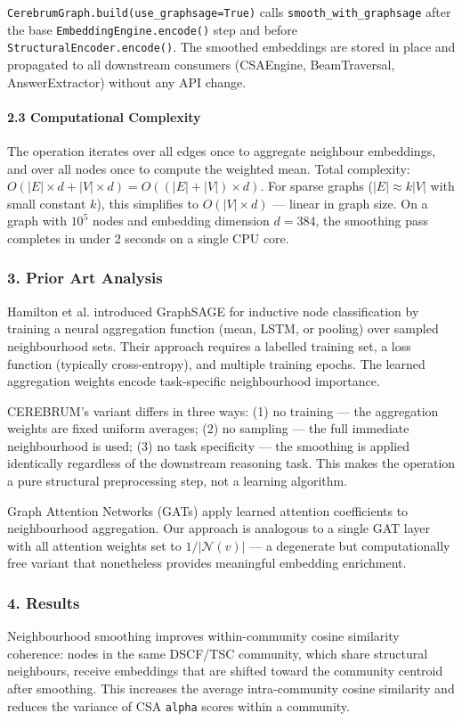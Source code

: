 \texttt{CerebrumGraph.build(use\_graphsage=True)} calls \texttt{smooth\_with\_graphsage} after the base \texttt{EmbeddingEngine.encode()} step and before \texttt{StructuralEncoder.encode()}. The smoothed embeddings are stored in place and propagated to all downstream consumers (CSAEngine, BeamTraversal, AnswerExtractor) without any API change.

\paragraph{2.3 Comput\-ational Complexity}
The operation iterates over all edges once to aggregate neighbour embeddings, and over all nodes once to compute the weighted mean. Total complexity: $O(|E| \times d + |V| \times d) = O((|E| + |V|) \times d)$. For sparse graphs ($|E| \approx k|V|$ with small constant $k$), this simplifies to $O(|V| \times d)$ — linear in graph size. On a graph with $10^5$ nodes and embedding dimension $d = 384$, the smoothing pass completes in under 2 seconds on a single CPU core.

\subsubsection{3. Prior Art Analysis}
Hamilton et al. \cite{hamilton2017graphsage} introduced GraphSAGE for inductive node class\-ification by training a neural aggregation function (mean, LSTM, or pooling) over sampled neigh\-bourhood sets. Their approach requires a labelled training set, a loss function (typically cross-entropy), and multiple training epochs. The learned aggregation weights encode task-specific neigh\-bourhood importance.

CEREBRUM's variant differs in three ways: (1) no training — the aggregation weights are fixed uniform averages; (2) no sampling — the full immediate neigh\-bourhood is used; (3) no task specificity — the smoothing is applied identically regardless of the downstream reasoning task. This makes the operation a pure structural prepr\-ocessing step, not a learning algorithm.

Graph Attention Networks (GATs) \cite{velickovic2018gat} apply learned attention coeff\-icients to neigh\-bourhood aggregation. Our approach is analogous to a single GAT layer with all attention weights set to $1/|\mathcal{N}(v)|$ — a degenerate but compu\-tationally free variant that nonetheless provides meaningful embedding enrichment.

\subsubsection{4. Results}
Neighb\-ourhood smoothing improves within-community cosine similarity coherence: nodes in the same DSCF/TSC community, which share structural neighbours, receive embeddings that are shifted toward the community centroid after smoothing. This increases the average intra-community cosine similarity and reduces the variance of CSA \texttt{alpha} scores within a community.

